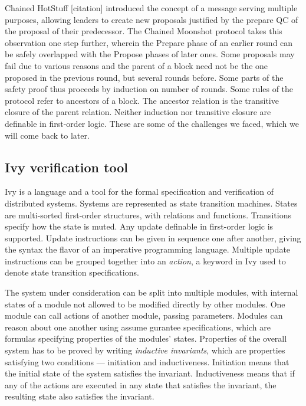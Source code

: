 Chained HotStuff [citation]  introduced the concept of a message serving multiple purposes, allowing leaders to create new proposals justified by the prepare QC of the proposal of their predecessor. The Chained Moonshot protocol takes this observation one step further, wherein the Prepare phase of an earlier round can be safely overlapped with the Propose phases of later ones. Some proposals may fail due to various reasons and the parent of a block need not be the one proposed in the previous round, but several rounds before. Some parts of the safety proof thus proceeds by induction on number of rounds.  Some rules of the protocol refer to ancestors of a block. The ancestor relation is the transitive closure of the parent relation. Neither induction nor transitive closure are definable in first-order logic. These are some of the challenges we faced, which we will come back to later.

\subsection{Ivy verification tool}
Ivy is a language and a tool for the formal specification and verification of distributed systems. Systems are represented as state transition machines. States are multi-sorted first-order structures, with relations and functions. Transitions specify how the state is muted. Any update definable in first-order logic is supported. Update instructions can be given in sequence one after another, giving the syntax the flavor of an imperative programming language. Multiple update instructions can be grouped together into an \emph{action}, a keyword in Ivy used to denote state transition specifications.

The system under consideration can be split into multiple modules, with internal states of a module not allowed to be modified directly by other modules. One module can call actions of another module, passing parameters. Modules can reason about one another using assume gurantee specifications, which are formulas specifying properties of the modules' states. Properties of the overall system has to be proved by writing \emph{inductive invariants}, which are properties satisfying two conditions --- initiation and inductiveness. Initiation means that the initial state of the system satisfies the invariant. Inductiveness means that if any of the actions are executed in any state that satisfies the invariant, the resulting state also satisfies the invariant.

